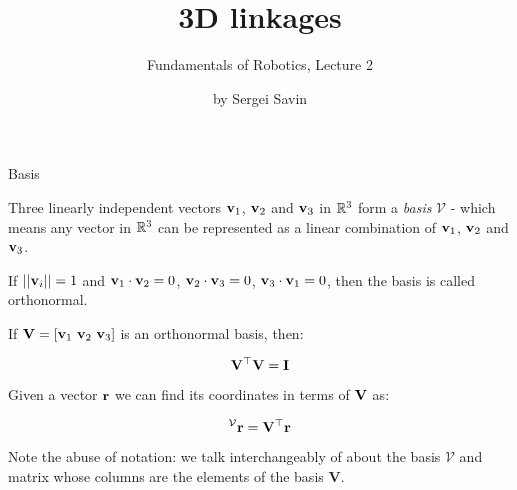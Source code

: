 \documentclass{beamer}
\title{3D linkages}
\subtitle{Fundamentals of Robotics, Lecture 2}
\author{by Sergei Savin}
\date{\mydate}
\begin{document}
\maketitle


%
%



\begin{frame}{Basis}
	\begin{flushleft}
		
		
		Three linearly independent vectors $\mathbf{v}_1$, $\mathbf{v}_2$ and $\mathbf{v}_3$ in $\mathbb{R}^3$ form a \emph{basis} $\mathcal V$ - which means any vector in $\mathbb{R}^3$ can be represented as a linear combination of $\mathbf{v}_1$, $\mathbf{v}_2$ and $\mathbf{v}_3$.
		
		\bigskip
		
		If  $||\mathbf{v}_i|| = 1$ and  $\mathbf{v}_1 \cdot \mathbf{v}_2 = 0$, $\mathbf{v}_2 \cdot \mathbf{v}_3 = 0$, $\mathbf{v}_3 \cdot \mathbf{v}_1 = 0$, then the basis is called orthonormal.
		
		\bigskip
		
		If $\bo{V} = [\bo{v}_1 \ \bo{v}_2 \ \bo{v}_3]$ is an orthonormal basis, then:
		
		\begin{equation}
			\mathbf{V}^\top \mathbf{V} = \mathbf{I} 
		\end{equation}
	
		Given a vector $\mathbf{r}$ we can find its coordinates in terms of  $ \mathbf{V}$ as:
		
		\begin{equation}
			^\mathcal{V} \mathbf{r} =\mathbf{V}^\top \mathbf{r}
		\end{equation}		
	
		Note the abuse of notation: we talk interchangeably of about the basis $\mathcal V$ and matrix whose columns are the elements of the basis $\mathbf V$.
		
	\end{flushleft}
\end{frame}
\end{document}
